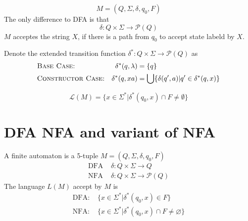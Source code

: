 \documentclass{aq-notes}
\begin{document}
\begin{definition}[NFA]
    \[M = (Q,\Sigma, \delta, q_0,F)\]
    The only difference to DFA is that\[\delta: Q\times \Sigma\to \mathcal{P}(Q)\]
    $M$ acceptes the string $X$, if there is a path from $q_0$ to accept state labeld by $X$.
\end{definition}
\begin{definition}
    Denote the extended transition function $\delta^*:Q\times \Sigma\to \mathcal{P}(Q)$ as
    \begin{align*}
        &\mbox{\normalfont\scshape Base Case:} &\delta^*(q,\lambda) &= \{q\}\\
        &\mbox{\normalfont\scshape Constructor Case:} &\delta^*(q,xa) &= \bigcup\{\delta(q',a)|q'\in \delta^*(q,x)\}
    \end{align*}
\end{definition}\begin{definition}
    \[\mathcal{L}(M) = \{x\in \Sigma^*|\delta^*(q_0,x)\cap F\neq \emptyset\}\]
\end{definition}
\newpage
\section{DFA NFA and variant of NFA}
\begin{recall}
    A finite automaton is a 5-tuple
$M = (Q,\Sigma, \delta, q_0, F)$
\begin{align*}
    \mbox{DFA }&\delta:Q\times \Sigma \to Q\\
    \mbox{NFA }&\delta:Q\times \Sigma \to \mathcal{P}(Q)
\end{align*}
The language $L(M)$ accept by $M$ is
\begin{align*}
    \mbox{DFA: }&\{x\in \Sigma^*|\delta^*(q_0,x)\in F\}\\
    \mbox{NFA: }&\{x\in \Sigma^*|\delta^*(q_0,x)\cap F \neq \varnothing\}
\end{align*}
\end{recall}
\end{document}
